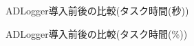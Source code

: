 \begin{figure}[ht]
	\begin{center}
		\caption{ADLogger導入前後の比較(タスク時間(秒))}
		\label{fig:11}
	\end{center}
\end{figure}

\begin{figure}[ht]
	\begin{center}
		\caption{ADLogger導入前後の比較(タスク時間(\%))}
		\label{fig:12}
	\end{center}
\end{figure}

